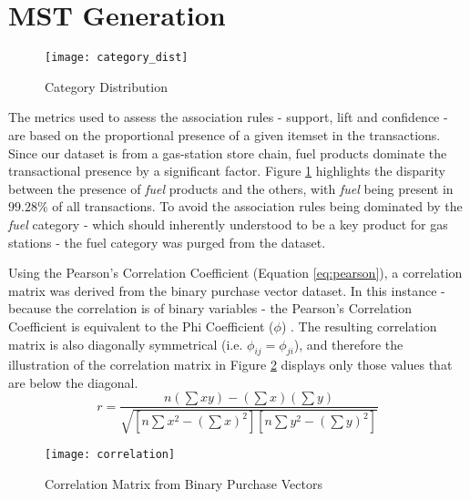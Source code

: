 \section{MST Generation}
\begin{figure}[H]
\centering
\texttt{[image: category\_dist]}
\caption{Category Distribution}
\label{fig:cat_dist}
\end{figure}
The metrics used to assess the association rules - support, lift and confidence - are based on the proportional presence of a given itemset in the transactions. Since our dataset is from a gas-station store chain, fuel products dominate the transactional presence by a significant factor. Figure \ref{fig:cat_dist} highlights the disparity between the presence of \textit{fuel} products and the others, with \textit{fuel} being present in $99.28\%$ of all transactions. To avoid the association rules being dominated by the \textit{fuel} category - which should inherently understood to be a key product for gas stations - the fuel category was purged from the dataset.

Using the Pearson's Correlation Coefficient \cite{pearson} (Equation \ref{eq:pearson}), a correlation matrix was derived from the binary purchase vector dataset. In this instance - because the correlation is of binary variables - the Pearson's Correlation Coefficient is equivalent to the Phi Coefficient ($\phi$) \cite{phi}. The resulting correlation matrix is also diagonally symmetrical (i.e. $\phi_{ij} = \phi_{ji}$), and therefore the illustration of the correlation matrix in Figure \ref{fig:correlation} displays only those values that are below the diagonal.
\begin{equation}
\label{eq:pearson}
r = \frac{ n(\sum xy) - (\sum x) (\sum y)} { \sqrt{ [n\sum x^2 - (\sum x)^2] [n \sum y^2 - (\sum y)^2] } }
\end{equation}




\begin{figure}[H]
\centering
\texttt{[image: correlation]}
\caption{Correlation Matrix from Binary Purchase Vectors}
\label{fig:correlation}
\end{figure}

